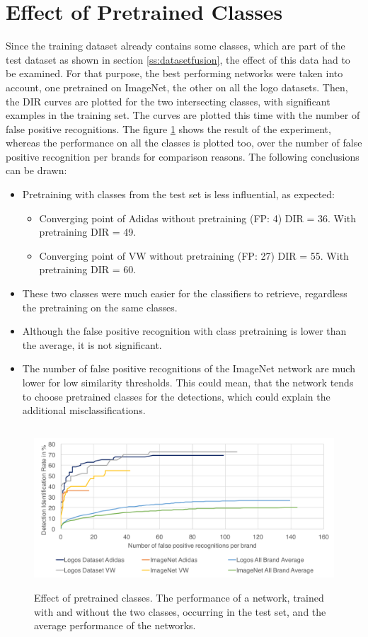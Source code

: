 \section{Effect of Pretrained Classes}
Since the training dataset already contains some classes, which are part of the test dataset as shown in section \ref{ss:datasetfusion}, the effect of this data had to be examined. For that purpose, the best performing networks were taken into account, one pretrained on ImageNet, the other on all the logo datasets. Then, the DIR curves are plotted for the two intersecting classes, with significant examples in the training set. The curves are plotted this time with the number of false positive recognitions. The figure \ref{f:commonbrandseffect} shows the result of the experiment, whereas the performance on all the classes is plotted too, over the number of false positive recognition per brands for comparison reasons. The following conclusions can be drawn:
\begin{itemize}
    \item Pretraining with classes from the test set is less influential, as expected:
    \begin{itemize}
        \item Converging point of Adidas without pretraining (FP: 4)  DIR = 36. With pretraining DIR = 49.
        \item Converging point of VW without pretraining (FP: 27)  DIR = 55. With pretraining DIR = 60.
    \end{itemize}
    \item These two classes were much easier for the classifiers to retrieve, regardless the pretraining on the same classes.
    \item Although the false positive recognition with class pretraining is lower than the average, it is not significant.
    \item The number of false positive recognitions of the ImageNet network are much lower for low similarity thresholds. This could mean, that the network tends to choose pretrained classes for the detections, which could explain the additional misclassifications.
\end{itemize}
\begin{figure}
  \centering
  \includegraphics[height=60mm]{images/mt/commonbrandseffect.pdf}
  \caption{Effect of pretrained classes. The performance of a network, trained with and without the two classes, occurring in the test set, and the average performance of the networks.}
  \label{f:commonbrandseffect}
\end{figure}


